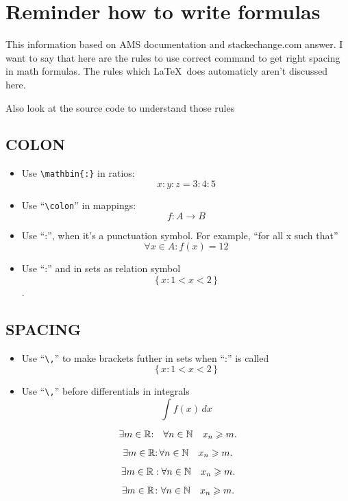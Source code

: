 \documentclass[a5paper,openany,9pt]{extbook}
\begin{document}
\chapter*{Reminder how to write formulas}

This information based on AMS documentation and stackechange.com answer. I want to say that here are the rules to use correct command to get right spacing in math formulas. The rules which \LaTeX\ does automaticly aren't discussed here.

Also look at the source code to understand those rules

\section{COLON}

\begin{itemize}
\item
Use \verb|\mathbin{:}| in ratios:
$$x\mathbin{:}y\mathbin{:}z = 3\mathbin{:}4\mathbin{:}5$$

\item
Use ``\verb=\colon='' in mappings:
$$f\colon A \to B$$

\item
Use ``:'', when it's a punctuation symbol. For example, ``for all x such that''
$$\forall x \in A\colon f(x) = 12$$

\item
Use ``:'' and in sets as relation symbol
$$\{\,x : 1 < x < 2\,\}$$.

\end{itemize}
	
\section{SPACING}

\begin{itemize}
\item
Use ``\verb=\,='' to make brackets futher in sets when ``:'' is called
$$\{\,x : 1 < x < 2\,\}$$
\item
Use ``\verb=\,='' before differentials in integrals
$$ \int f(x)\, dx$$
\end{itemize}

\newpage

$$
\exists m \in \mathbb{R}{:}\quad \forall n \in \mathbb{N}\quad x_n \geqslant m.
$$

$$
\exists m \in \mathbb{R} \mathpunct{:} \forall n \in \mathbb{N}\quad x_n \geqslant m.
$$

$$
\exists m \in \mathbb{R} : \forall n \in \mathbb{N}\quad x_n \geqslant m.
$$

$$
\exists m \in \mathbb{R}\colon \forall n \in \mathbb{N}\quad x_n \geqslant m.
$$
\end{document}
